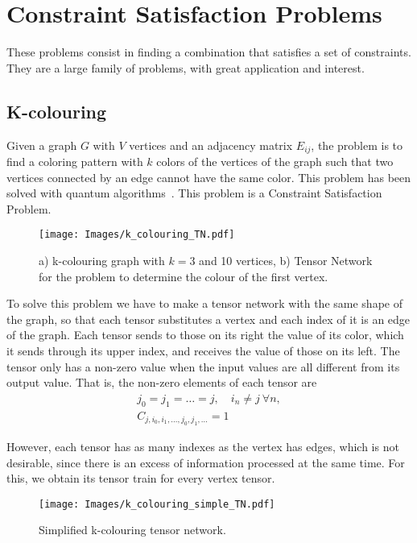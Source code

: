 \section{Constraint Satisfaction Problems}
These problems consist in finding a combination that satisfies a set of constraints. They are a large family of problems, with great application and interest.

\subsection{K-colouring}
Given a graph $G$ with $V$ vertices and an adjacency matrix $E_{ij}$, the problem is to find a coloring pattern with $k$ colors of the vertices of the graph such that two vertices connected by an edge cannot have the same color. This problem has been solved with quantum algorithms~\cite{Colouring_Quantum}. This problem is a Constraint Satisfaction Problem.
\begin{figure}[h]
    \centering
    \texttt{[image: Images/k\_colouring\_TN.pdf]}
    \caption{a) k-colouring graph with $k=3$ and 10 vertices, b) Tensor Network for the problem to determine the colour of the first vertex.}
    \label{fig: kcolouring}
\end{figure}

To solve this problem we have to make a tensor network with the same shape of the graph, so that each tensor substitutes a vertex and each index of it is an edge of the graph. Each tensor sends to those on its right the value of its color, which it sends through its upper index, and receives the value of those on its left. The tensor only has a non-zero value when the input values are all different from its output value. That is, the non-zero elements of each tensor are
\begin{equation}
    \begin{gathered}
        j_0 = j_1 = \dots= j,\quad i_n\neq j\ \forall n,\\
        C_{j,i_0,i_1,\dots, j_0,j_1, \dots} = 1
    \end{gathered}
\end{equation}

However, each tensor has as many indexes as the vertex has edges, which is not desirable, since there is an excess of information processed at the same time. For this, we obtain its tensor train for every vertex tensor.
\begin{figure}[h]
    \centering
    \texttt{[image: Images/k\_colouring\_simple\_TN.pdf]}
    \caption{Simplified k-colouring tensor network.}
    \label{fig: kcolouring simple}
\end{figure}

